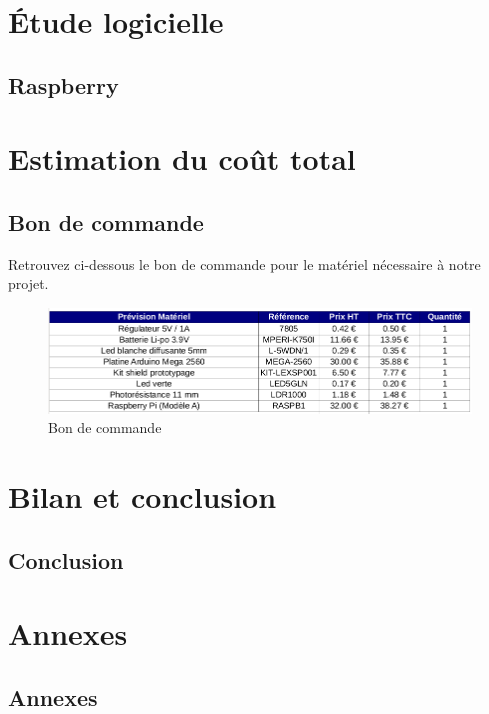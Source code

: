 \documentclass[12pt,titlepage,a4paper]{report}
\begin{document}
	\part{Étude logicielle}
	\chapter{Raspberry}
	\minitoc
	


	\part{Estimation du coût total}
	\chapter{Bon de commande}
	Retrouvez ci-dessous le bon de commande pour le matériel nécessaire à notre projet.
	\begin{figure}[h]
		\centering
		\includegraphics[width=550px]{images/lextronic.png}
		\caption{Bon de commande}
	\end{figure}


	\part{Bilan et conclusion}
	\chapter{Conclusion}
	


	\part{Annexes}
	\chapter{Annexes}
	
\end{document}
